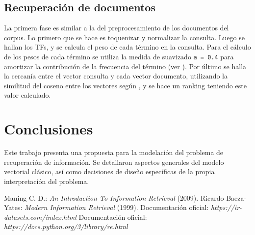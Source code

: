 \documentclass{llncs}
\begin{document}
	\subsection{Recuperación de documentos}
	
	La primera fase es similar a la del preprocesamiento de los documentos del corpus. Lo primero que se hace es toquenizar y normalizar la consulta. Luego se hallan los TFs, y se calcula el peso de cada t\'ermino en la consulta. Para el c\'alculo de los pesos de cada t\'ermino  se utiliza la medida de suavizado \texttt{a = 0.4} para amortizar la contribuci\'on de la frecuencia del t\'ermino (ver \cite[ecuaci\'on (2.4)]{B2}). Por \'ultimo se halla la cercan\'ia entre el vector consulta y cada vector documento, utilizando la similitud del coseno entre los vectores seg\'un \cite[Ecuaci\'on 6.10]{B1}, y se hace un ranking teniendo este valor calculado.
	
	\section{Conclusiones}
	
	Este trabajo presenta una propuesta para la modelaci\'on del problema de recuperaci\'on de informaci\'on. Se detallaron aspectos generales del modelo vectorial cl\'asico, as\'i como decisiones de dise\~no espec\'ificas de la propia interpretaci\'on del problema.
	
	\begin{thebibliography}{20}
		 Maning C. D.: \emph{An Introduction To Information Retrieval} (2009).
		 Ricardo Baeza-Yates: \emph{Modern Information Retrieval} (1999).
		 Documentaci\'on oficial: \emph{https://ir-datasets.com/index.html}
		 Documentaci\'on oficial: \emph{https://docs.python.org/3/library/re.html}
	\end{thebibliography}
	
\end{document}
